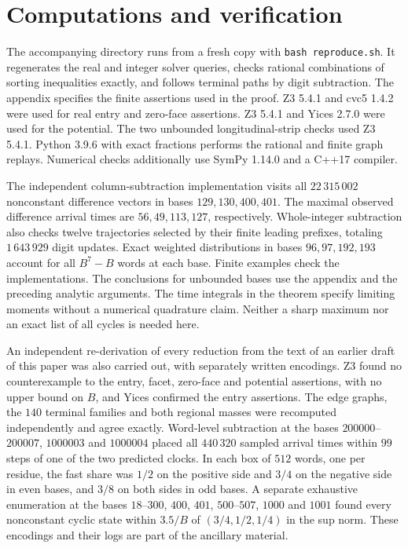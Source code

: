 \documentclass[11pt,reqno]{amsart}
\begin{document}
\section{Computations and verification}
The accompanying directory runs from a fresh copy with
\texttt{bash reproduce.sh}. It regenerates the real and integer solver
queries, checks rational combinations of sorting inequalities exactly,
and follows terminal paths by digit subtraction. The appendix specifies
the finite assertions used in the proof. Z3 5.4.1 and cvc5 1.4.2 were
used for real entry and zero-face assertions. Z3 5.4.1 and Yices 2.7.0
were used for the potential. The two unbounded longitudinal-strip
checks used Z3 5.4.1. Python 3.9.6 with exact fractions performs the
rational and finite graph replays. Numerical checks additionally use
SymPy 1.14.0 and a C++17 compiler.

The independent column-subtraction implementation visits all $22\,315\,002$
nonconstant difference vectors in bases $129,130,400,401$. The maximal
observed difference arrival times are $56,49,113,127$, respectively.
Whole-integer subtraction also checks twelve trajectories selected by
their finite leading prefixes, totaling $1\,643\,929$ digit updates.
Exact weighted distributions in bases $96,97,192,193$ account for all
$B^7-B$ words at each base. Finite examples check the implementations.
The conclusions for unbounded bases use the appendix and the preceding
analytic arguments. The time integrals in the theorem specify limiting
moments without a numerical quadrature claim. Neither a sharp maximum nor
an exact list of all cycles is needed here.

An independent re-derivation of every reduction from the text of an earlier
draft of this paper was also carried out, with separately written encodings.
Z3 found no counterexample to the entry, facet, zero-face and potential
assertions, with no upper bound on $B$, and Yices confirmed the entry
assertions. The edge graphs, the $140$ terminal families and both regional
masses were recomputed independently and agree exactly. Word-level
subtraction at the bases $200000$--$200007$, $1000003$ and $1000004$ placed
all $440\,320$ sampled arrival times within $99$ steps of one of the two
predicted clocks. In each box of $512$ words, one per residue, the fast
share was $1/2$ on the positive side and $3/4$ on the negative side in even
bases, and $3/8$ on both sides in odd bases. A separate exhaustive
enumeration at the bases $18$--$300$, $400$, $401$, $500$--$507$, $1000$
and $1001$ found every nonconstant cyclic state within $3.5/B$ of
$(3/4,1/2,1/4)$ in the sup norm. These encodings and their logs are part of the ancillary
material.
\end{document}
